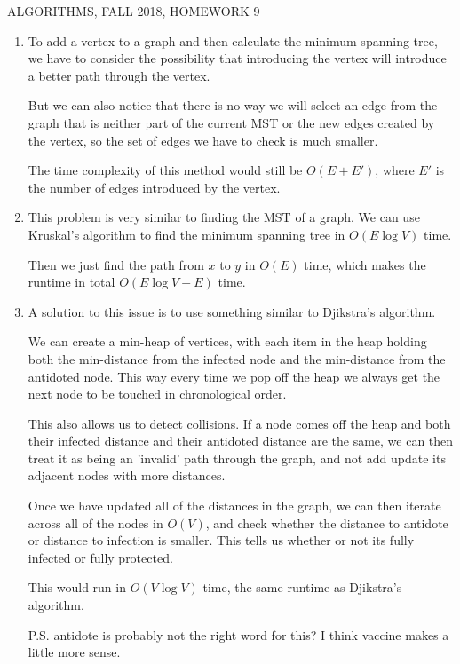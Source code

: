 \documentclass[12pt]{article}
\begin{document}
  
\pagestyle{empty}
 

\begin{center} ALGORITHMS,   FALL 2018, HOMEWORK 9
\end{center}

\begin{enumerate}

    \item To add a vertex to a graph and then calculate the minimum spanning tree, we have to consider the possibility that introducing the vertex
    will introduce a better path through the vertex.

    But we can also notice that there is no way we will select an edge from the graph that is neither part of the current MST or the new edges created by
    the vertex, so the set of edges we have to check is much smaller.

    The time complexity of this method would still be $O(E + E')$, where $E'$ is the number of edges introduced by the vertex.

    \pagebreak

    \item

    This problem is very similar to finding the MST of a graph. We can use Kruskal's algorithm to find the minimum spanning tree in $O(E\log V)$ time.

    Then we just find the path from $x$ to $y$ in $O(E)$ time, which makes the runtime in total $O(E\log V + E)$ time.

    \pagebreak

    \item

    A solution to this issue is to use something similar to Djikstra's algorithm.

    We can create a min-heap of vertices, with each item in the heap holding both the min-distance from the infected node and the min-distance 
    from the antidoted node. This way every time we pop off the heap we always get the next node to be touched in chronological order.

    This also allows us to detect collisions. If a node comes off the heap and both their infected distance and their antidoted distance are the same,
    we can then treat it as being an 'invalid' path through the graph, and not add update its adjacent nodes with more distances.

    Once we have updated all of the distances in the graph, we can then iterate across all of the nodes in $O(V)$, and check whether the distance
    to antidote or distance to infection is smaller. This tells us whether or not its fully infected or fully protected.

    This would run in $O(V\log V)$ time, the same runtime as Djikstra's algorithm.

    P.S. antidote is probably not the right word for this? I think vaccine makes a little more sense.



\end{enumerate}
\end{document}
